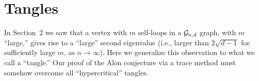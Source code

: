 \documentclass[12pt]{article}
\newtheorem{theorem}{Theorem}[section]
\newcommand{\cg}{{\cal G}}
\newcommand{\cgnd}{\cg_{n,d}}
\newcommand{\tang}{{\psi}}	%
\newcommand{\tree}{{\rm Tree}}
\newcommand{\proof}{{\par\noindent {\bf Proof}\space\space}}
\newcommand{\proofbox}{\begin{flushright}$\Box$\end{flushright}}
\newcommand{\ird}[1]{{\rm Irred}_{#1}}
\begin{document}




\section{Tangles}

In Section~2 we saw that a vertex with $m$ self-loops in a
$\cgnd$ graph, with $m$ ``large,'' gives rise to a ``large'' second
eigenvalue (i.e., larger than $2\sqrt{d-1}$ for sufficiently large $m$,
as $n\to\infty$).  Here we generalize this observation to what we call
a ``tangle.''  Our proof of the Alon conjecture via a trace method must
somehow overcome all ``hypercritical'' tangles.
\end{document}
